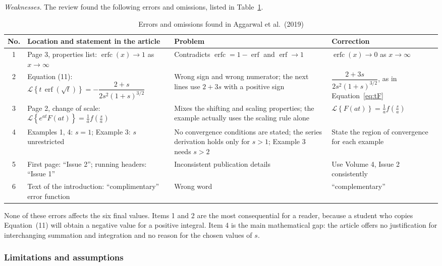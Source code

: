 \documentclass[12pt,a4paper]{article}
\theoremstyle{definition}
\theoremstyle{plain}
\theoremstyle{remark}
\newcommand{\erf}{\operatorname{erf}}
\newcommand{\erfc}{\operatorname{erfc}}
\newcommand{\Lap}[1]{\mathcal{L}\!\left\{#1\right\}}
\begin{document}
	\textit{Weaknesses.} The review found the following errors and omissions, listed in Table~\ref{tab:errors}.
	
	\begin{table}[htbp]
		\centering
		\caption{Errors and omissions found in Aggarwal et al.\ (2019)}
		\label{tab:errors}
		\small
		\renewcommand{\arraystretch}{1.3}
		\begin{tabular}{@{}c p{4.2cm} p{4.5cm} p{4.2cm}@{}}
			\toprule
			No. & Location and statement in the article & Problem & Correction \\
			\midrule
			1 & Page 3, properties list: $\erfc(x)\to 1$ as $x\to\infty$ & Contradicts $\erfc=1-\erf$ and $\erf\to 1$ & $\erfc(x)\to 0$ as $x\to\infty$ \\
			2 & Equation (11): $\Lap{t\,\erf(\sqrt{t})}=-\dfrac{2+s}{2s^2(1+s)^{3/2}}$ & Wrong sign and wrong numerator; the next lines use $2+3s$ with a positive sign & $\dfrac{2+3s}{2s^2(1+s)^{3/2}}$, as in Equation~\eqref{eq:tF} \\
			3 & Page 2, change of scale: $\Lap{e^{at}F(at)}=\tfrac{1}{a}f\!\left(\tfrac{s}{a}\right)$ & Mixes the shifting and scaling properties; the example actually uses the scaling rule alone & $\Lap{F(at)}=\tfrac{1}{a}f\!\left(\tfrac{s}{a}\right)$ \\
			4 & Examples 1, 4: $s=1$; Example 3: $s$ unrestricted & No convergence conditions are stated; the series derivation holds only for $s>1$; Example 3 needs $s>2$ & State the region of convergence for each example \\
			5 & First page: ``Issue 2''; running headers: ``Issue 1'' & Inconsistent publication details & Use Volume 4, Issue 2 consistently \\
			6 & Text of the introduction: ``complimentary'' error function & Wrong word & ``complementary'' \\
			\bottomrule
		\end{tabular}
	\end{table}
	
	None of these errors affects the six final values. Items 1 and 2 are the most consequential for a reader, because a student who copies Equation~(11) will obtain a negative value for a positive integral. Item 4 is the main mathematical gap: the article offers no justification for interchanging summation and integration and no reason for the chosen values of $s$.
	
	\subsubsection{Limitations and assumptions}
	
\end{document}
